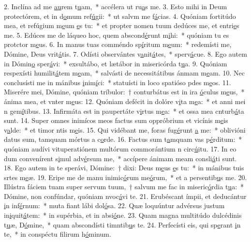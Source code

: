 2. Inclína ad me \uline{au}rem t\uline{u}am,~* accélera ut ru\uline{a}s me.
3. Esto mihi in Deum protectórem, et in d\uline{o}mum ref\uline{ú}gii:~* ut salvm me f\uline{á}cias.
4. Quóniam fortitúdo mea, et refúgium m\uline{e}um \uline{e}s tu:~* et propter nomen tuum dedúces me, et entri\uline{e}s me.
5. Edúces me de láqueo hoc, quem abscond\uline{é}runt m\uline{i}hi:~* quóniam tu es protctor m\uline{e}us.
6. In manus tuas comméndo sp\uline{í}ritum m\uline{e}um:~* redemísti me, Dómine, Deus vrit\uline{á}tis.
7. Odísti observántes v\uline{a}nit\uline{á}tes,~* sperv\uline{á}cue.
8. Ego autem in Dómin\uline{o} sper\uline{á}vi:~* exsultábo, et lætábor in misericórda t\uline{u}a.
9. Quóniam respexísti humilit\uline{á}tem m\uline{e}am,~* salvásti de necessitátibus ánmam m\uline{e}am.
10. Nec conclusísti me in mánibus \uline{i}nim\uline{í}ci:~* statuísti in loco spatióso pdes m\uline{e}os.
11. Miserére mei, Dómine, quóniam tríbulor:~† conturbátus est in ira \uline{ó}culus m\uline{e}us,~* ánima mea, et vnter m\uline{e}us:
12. Quóniam defécit in dolóre v\uline{i}ta m\uline{e}a:~* et anni mei n gem\uline{í}tibus.
13. Infirmáta est in paupertáte v\uline{i}rtus m\uline{e}a:~* et ossa mea cnturb\uline{á}ta sunt.
14. Super omnes inimícos meos factus sum oppróbrium et vicínis m\uline{e}is v\uline{a}lde:~* et timor ntis m\uline{e}is.
15. Qui vidébant me, foras fug\uline{é}runt \uline{a} me:~* oblivióni datus sum, tamquam mórtus a c\uline{o}rde.
16. Factus sum t\uline{a}mquam vas p\uline{é}rditum:~* quóniam audívi vituperatiónem multórum commorántium n circ\uline{ú}itu.
17. In eo dum convenírent s\uline{i}mul adv\uline{é}rsum me,~* accípere ánimam meam consli\uline{á}ti sunt.
18. Ego autem in te sperávi, Dómine:~† dixi: Deus m\uline{e}us \uline{e}s tu:~* in mánibus tuis srtes m\uline{e}æ.
19. Eripe me de manu inimic\uline{ó}rum me\uline{ó}rum,~* et a persentib\uline{u}s me.
20. Illústra fáciem tuam super servum tuum,~† salvum me fac in miseric\uline{ó}rdia t\uline{u}a:~* Dómine, non confúndar, quóniam nvoc\uline{á}vi te.
21. Erubéscant ímpii, et deducántur \uline{i}n inf\uline{é}rnum:~* muta fiant lábi dol\uline{ó}sa.
22. Quæ loquúntur advérsus justum in\uline{i}quit\uline{á}tem:~* in supérbia, et in absi\uline{ó}ne.
23. Quam magna multitúdo dulcédinis t\uline{u}æ, D\uline{ó}mine,~* quam abscondísti timntib\uline{u}s te.
24. Perfecísti eis, qui sp\uline{e}rant \uline{i}n te,~* in conspéctu filirum h\uline{ó}minum.
